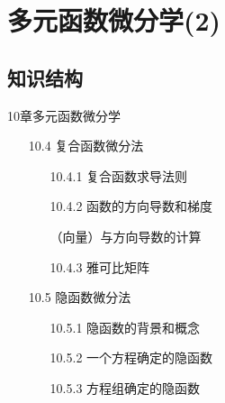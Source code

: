 \documentclass[12pt,UTF8]{ctexart}
\begin{document}
\setcounter{section}{14}
\section{多元函数微分学(2)}
\noindent
\subsection{知识结构}
10章多元函数微分学
	\begin{enumerate}
		\item[10.4]复合函数微分法
		\begin{enumerate}
			\item[10.4.1]复合函数求导法则
			\item[10.4.2]函数的方向导数和梯度
				\begin{enumerate}
					（向量）与方向导数的计算
				\end{enumerate}
			\item[10.4.3]雅可比矩阵
		\end{enumerate}
		\item[10.5]隐函数微分法
		\begin{enumerate}
			\item[10.5.1]隐函数的背景和概念
			\item[10.5.2]一个方程确定的隐函数
			\item[10.5.3]方程组确定的隐函数
		\end{enumerate}
	\end{enumerate}
\end{document}

